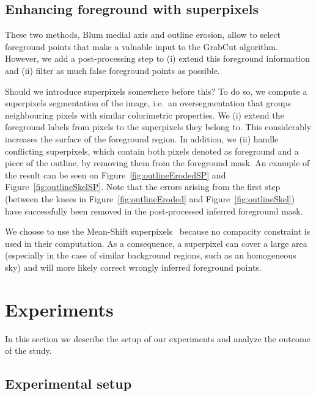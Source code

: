 \subsection{Enhancing foreground with superpixels}%
\label{sec:superpixels}


These two methods, Blum medial axis and outline erosion,
allow to select foreground points that make a valuable input
to the GrabCut algorithm.
However, we add a post-processing step to (i) extend this foreground
information and (ii) filter as much false foreground points as possible.


\alert{Should we introduce superpixels somewhere before this?}
To do so, we compute a superpixels segmentation of the image,
i.e.\ an oversegmentation that groups neighbouring pixels
with similar colorimetric properties.
We (i) extend the foreground labels from pixels
to the superpixels they belong to.
This considerably increases the surface of the foreground region.
In addition, we (ii) handle conflicting superpixels,
which contain both pixels denoted as foreground and a piece of the outline,
by removing them from the foreground mask. An example of the result
can be seen on Figure~\ref{fig:outlineErodedSP}
and Figure~\ref{fig:outlineSkelSP}.
Note that the errors arising from the first step
(between the knees in Figure~\ref{fig:outlineEroded}
and Figure~\ref{fig:outlineSkel})
have successfully been removed
in the post-processed inferred foreground mask.


We choose to use the Mean-Shift superpixels~\cite{comaniciu2002mean}
because no compacity constraint is used in their computation.
As a consequence, a superpixel can cover a large area
(especially in the case of similar background regions,
such as an homogeneous sky) and will more likely correct
wrongly inferred foreground points.




\section{Experiments}%
\label{sec:experiment}


In this section we describe the setup of our experiments
and analyze the outcome of the study.


\subsection{Experimental setup}


